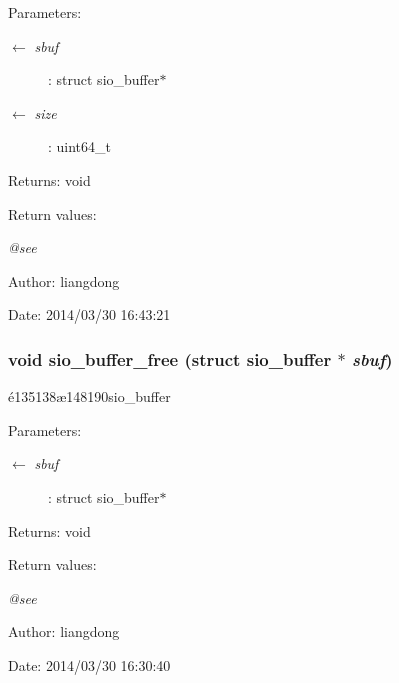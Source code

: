 \begin{Desc}
\item[Parameters:]
\begin{description}
\item[\mbox{$\leftarrow$} {\em sbuf}]: struct sio\_\-buffer$\ast$ \item[\mbox{$\leftarrow$} {\em size}]: uint64\_\-t \end{description}
\end{Desc}
\begin{Desc}
\item[Returns:]void \end{Desc}
\begin{Desc}
\item[Return values:]
\begin{description}
\item[{\em @see}]\end{description}
\end{Desc}
\begin{Desc}
\item[Author:]liangdong \end{Desc}
\begin{Desc}
\item[Date:]2014/03/30 16:43:21 \end{Desc}
\subsubsection{\setlength{\rightskip}{0pt plus 5cm}void sio\_\-buffer\_\-free (struct sio\_\-buffer $\ast$ {\em sbuf})}\label{sio__buffer_8h_a1}


\'{e}135138\ae{}148190sio\_\-buffer 

\begin{Desc}
\item[Parameters:]
\begin{description}
\item[\mbox{$\leftarrow$} {\em sbuf}]: struct sio\_\-buffer$\ast$ \end{description}
\end{Desc}
\begin{Desc}
\item[Returns:]void \end{Desc}
\begin{Desc}
\item[Return values:]
\begin{description}
\item[{\em @see}]\end{description}
\end{Desc}
\begin{Desc}
\item[Author:]liangdong \end{Desc}
\begin{Desc}
\item[Date:]2014/03/30 16:30:40 \end{Desc}
